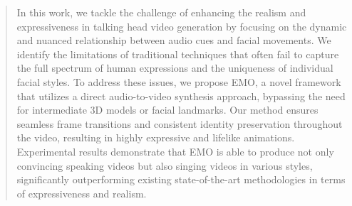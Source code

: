 \documentclass[runningheads]{llncs}
\begin{document}
\begin{abstract}
In this work, we tackle the challenge of enhancing the realism and expressiveness in talking head video generation by focusing on the dynamic and nuanced relationship between audio cues and facial movements. We identify the limitations of traditional techniques that often fail to capture the full spectrum of human expressions and the uniqueness of individual facial styles. To address these issues, we propose EMO, a novel framework that utilizes a direct audio-to-video synthesis approach, bypassing the need for intermediate 3D models or facial landmarks. Our method ensures seamless frame transitions and consistent identity preservation throughout the video, resulting in highly expressive and lifelike animations. Experimental results demonstrate that EMO is able to produce not only convincing speaking videos but also singing videos in various styles, significantly outperforming existing state-of-the-art methodologies in terms of expressiveness and realism.

\end{abstract}

\end{document}
